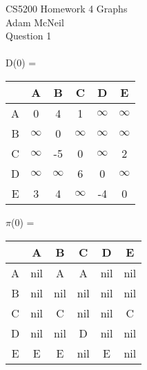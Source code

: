 \documentclass{article}
\begin{document}
CS5200 Homework 4 Graphs\\
Adam McNeil\\
Question 1 \\

\\
D(0) = 
\begin{tabular}{ c | c | c | c | c | c }        
    
    & A & B & C & D & E \\ 
    \hline
  A & 0 & 4 & 1 & $\infty$ & $\infty$ \\  
    \hline
  B & $\infty$ & 0 & $\infty$ & $\infty$ & $\infty$ \\
    \hline
  C & $\infty$ & -5 & 0 & $\infty$ & 2 \\
    \hline
  D & $\infty$ & $\infty$ & 6 & 0 & $\infty$ \\     
    \hline
  E & 3 & 4 & $\infty$ & -4 & 0 \\

\end{tabular}
${\pi}$(0) =
\begin{tabular}{ c | c | c | c | c | c }        
    
    & A & B & C & D & E \\ 
    \hline
  A & nil & A & A & nil & nil \\  
    \hline
  B & nil & nil & nil & nil & nil \\
    \hline
  C & nil & C & nil & nil & C \\
    \hline
  D & nil & nil & D & nil & nil \\     
    \hline
  E & E & E & nil & E & nil \\

\end{tabular}\\
\end{document}
